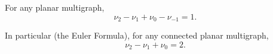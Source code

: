 For any planar multigraph,
$$\nu_2 - \nu_1 + \nu_0 - \nu_{-1} = 1.$$

In particular (the Euler Formula), for any connected planar multigraph,
$$\nu_2 - \nu_1 + \nu_0 = 2.$$
